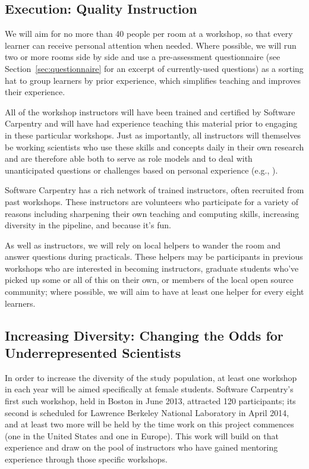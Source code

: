 \documentclass{proposalnsf}
\newlength{\up}
\begin{document}
\subsection{Execution: Quality Instruction}
We will aim for no more than 40 people per room at a workshop, so that
every learner can receive personal attention when needed.  Where
possible, we will run two or more rooms side by side and use a
pre-assessment questionnaire (see Section~\ref{sec:questionnaire} for an excerpt 
of currently-used questions) as a sorting hat to group learners by
prior experience, which simplifies teaching and improves their
experience.  %

All of the workshop instructors will have been trained and certified
by Software Carpentry and will have had experience teaching this
material prior to engaging in these particular workshops.  Just as
importantly, all instructors will themselves be working scientists who use these
skills and concepts daily in their own research and are therefore
able both to serve as role models and to deal with unanticipated
questions or challenges based on personal experience (e.g.,
\cite{ram2013}). 

Software Carpentry has a rich network of trained instructors, often recruited 
from past workshops. These instructors are volunteers who participate for a 
variety of reasons including sharpening their own teaching and computing skills, 
increasing diversity in the pipeline, and because it's fun. 

As well as instructors, we will rely on local helpers to wander the room and
answer questions during practicals. These helpers may be participants in
previous workshops who are interested in becoming instructors, graduate
students who've picked up some or all of this on their own, or members
of the local open source community; where possible, we will aim to have at
least one helper for every eight learners.

\subsection{Increasing Diversity: Changing the Odds for Underrepresented Scientists}
\label{sec:diversity}

In order to increase the diversity of the study population, at least
one workshop in each year will be aimed specifically at female
students.  Software Carpentry's first such workshop, held in Boston in
June 2013, attracted 120 participants; its second is scheduled for
Lawrence Berkeley National Laboratory in April 2014, and at least two
more will be held by the time work on this project commences (one in
the United States and one in Europe).  This work will build on that
experience and draw on the pool of instructors who have gained
mentoring experience through those specific workshops.
\end{document}

